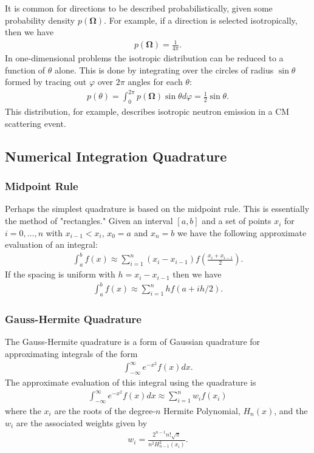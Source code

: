 \documentclass[11pt]{article}
\renewcommand\vec{\mathbf}
\begin{document}
It is common for directions to be described probabilistically, given some probability density \(p\left(\vec{\Omega}\right)\).  For example, if a direction is selected isotropically, then we have
\begin{align}
  p\left(\vec{\Omega}\right) = \frac{1}{4\pi}.
\end{align}
In one-dimensional problems the isotropic distribution can be reduced to a function of \(\theta\) alone.  This is done by integrating over the circles of radius \(\sin\theta\) formed by tracing out \(\varphi\) over \(2\pi\) angles for each \(\theta\):
\begin{align}
  p(\theta) = \int_0^{2\pi} p\left(\vec{\Omega}\right) \sin\theta d\varphi
            = \frac{1}{2} \sin\theta.
\end{align}
This distribution, for example, describes isotropic neutron emission in a CM scattering event.

\subsection{Numerical Integration Quadrature}
\label{sec:orgheadline69}
\subsubsection{Midpoint Rule}
\label{sec:orgheadline67}
Perhaps the simplest quadrature is based on the midpoint rule.  This is essentially the method of "rectangles."  Given an interval \([a,b]\) and a set of points \(x_i\) for \(i=0,\hdots,n\) with \(x_{i-1} < x_i\), \(x_0 = a\) and \(x_n = b\) we have the following approximate evaluation of an integral:
\begin{align}
  \int_a^b f(x) \approx \sum_{i=1}^n \left( x_i - x_{i-1} \right) f\left(\frac{x_i+x_{i-1}}{2}\right).
\end{align}
If the spacing is uniform with \(h = x_i - x_{i-1}\) then we have
\begin{align}
  \int_a^b f(x) \approx \sum_{i=1}^n h f\left(a + ih/2\right).
\end{align}
\subsubsection{Gauss-Hermite Quadrature}
\label{sec:orgheadline68}
The Gauss-Hermite quadrature is a form of Gaussian quadrature for approximating integrals of the form
\begin{align}
  \int_{-\infty}^\infty e^{-x^2} f(x) dx.
\end{align}
The approximate evaluation of this integral using the quadrature is
\begin{align}
  \int_{-\infty}^\infty e^{-x^2} f(x) dx \approx \sum_{i=1}^n w_i f(x_i)
\end{align}
where the \(x_i\) are the roots of the degree-\(n\) Hermite Polynomial, \(H_n(x)\), and the \(w_i\) are the associated weights given by
\begin{align}
  w_i = \frac{2^{n-1} n! \sqrt{\pi}}{n^2 H_{n-1}^2(x_i)}.
\end{align}
\end{document}
